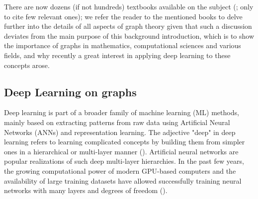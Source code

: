 \documentclass[binding=0.6cm]{sapthesis}
\newcommand{\mycite}[1]{(\cite{#1})}
\begin{document}
There are now dozens (if not hundreds) textbooks available on the subject (\cite{griffin2023applied,cormen2022introduction,diestel2017graph,bondy2011graph,berge1976graphs}; only to cite few relevant ones); we refer the reader to the mentioned books to delve further into the details of all aspects of graph theory given that such a discussion deviates from the main purpose of this background introduction, which is to show the importance of graphs in mathematics, computational sciences and various fields, and why recently a great interest in applying deep learning to these concepts arose. 

\subsection{Deep Learning on graphs}
\label{sec:bg.gnn.DL-on-graphs}
Deep learning is part of a broader family of machine learning (ML) methods, mainly based on extracting patterns from raw data using Artificial Neural Networks (ANNs) and representation learning. The adjective "deep" in deep learning refers to learning complicated concepts by building them from simpler ones in a hierarchical or multi-layer manner \mycite{LeCun2015DeepL}. Artificial neural networks are popular realizations of such deep multi-layer hierarchies. In the past few years, the growing computational power of modern GPU-based computers and the availability of large training datasets have allowed successfully training neural networks with many layers and degrees of freedom \mycite{Bronstein_2017}.
\end{document}
